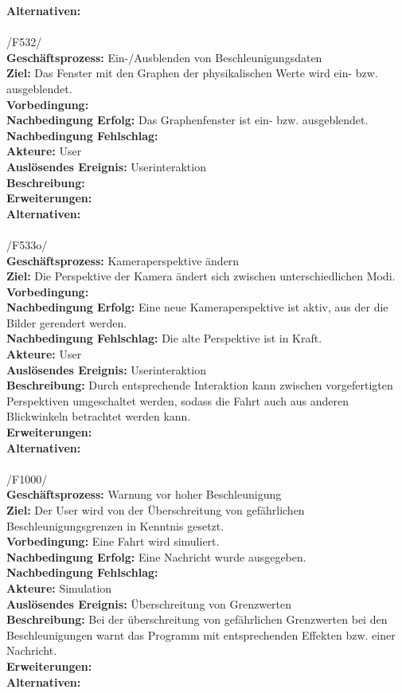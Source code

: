 \textbf{Alternativen:}\\
\\
/F532/\\
\textbf{Geschäftsprozess:} Ein-/Ausblenden von Beschleunigungsdaten\\
\textbf{Ziel:} Das Fenster mit den Graphen der physikalischen Werte wird ein- bzw. ausgeblendet.\\
\textbf{Vorbedingung:} \\
\textbf{Nachbedingung Erfolg:} Das Graphenfenster ist ein- bzw. ausgeblendet.\\
\textbf{Nachbedingung Fehlschlag:}\\ 
\textbf{Akteure:} User\\
\textbf{Auslösendes Ereignis:} Userinteraktion\\
\textbf{Beschreibung:} \\
\textbf{Erweiterungen:}\\
\textbf{Alternativen:}\\
\\
/F533o/\\
\textbf{Geschäftsprozess:} Kameraperspektive ändern\\
\textbf{Ziel:} Die Perspektive der Kamera ändert sich zwischen unterschiedlichen Modi.\\
\textbf{Vorbedingung:} \\
\textbf{Nachbedingung Erfolg:} Eine neue Kameraperspektive ist aktiv, aus der die Bilder gerendert werden.\\
\textbf{Nachbedingung Fehlschlag:} Die alte Perspektive ist in Kraft.\\
\textbf{Akteure:} User\\
\textbf{Auslösendes Ereignis:} Userinteraktion\\
\textbf{Beschreibung:} Durch entsprechende Interaktion kann zwischen vorgefertigten Perspektiven umgeschaltet werden, sodass die Fahrt auch aus anderen Blickwinkeln betrachtet werden kann.\\
\textbf{Erweiterungen:}\\
\textbf{Alternativen:}\\
\\
/F1000/\\
\textbf{Geschäftsprozess:} Warnung vor hoher Beschleunigung\\
\textbf{Ziel:} Der User wird von der Überschreitung von gefährlichen Beschleunigungsgrenzen in Kenntnis gesetzt.\\
\textbf{Vorbedingung:} Eine Fahrt wird simuliert.\\
\textbf{Nachbedingung Erfolg:} Eine Nachricht wurde ausgegeben.\\
\textbf{Nachbedingung Fehlschlag:} \\
\textbf{Akteure:} Simulation\\
\textbf{Auslösendes Ereignis:} Überschreitung von Grenzwerten\\
\textbf{Beschreibung:} Bei der überschreitung von gefährlichen Grenzwerten bei den Beschleunigungen warnt das Programm mit entsprechenden Effekten bzw. einer Nachricht.\\
\textbf{Erweiterungen:}\\
\textbf{Alternativen:}\\
